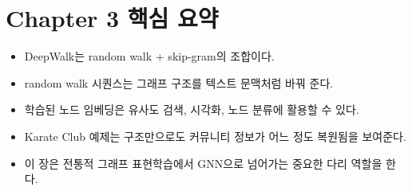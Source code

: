 \documentclass[11pt,a4paper]{article}
\begin{document}
\section{Chapter 3 핵심 요약}
\begin{itemize}[leftmargin=*]
  \item DeepWalk는 random walk + skip-gram의 조합이다.
  \item random walk 시퀀스는 그래프 구조를 텍스트 문맥처럼 바꿔 준다.
  \item 학습된 노드 임베딩은 유사도 검색, 시각화, 노드 분류에 활용할 수 있다.
  \item Karate Club 예제는 구조만으로도 커뮤니티 정보가 어느 정도 복원됨을 보여준다.
  \item 이 장은 전통적 그래프 표현학습에서 GNN으로 넘어가는 중요한 다리 역할을 한다.
\end{itemize}
\end{document}
